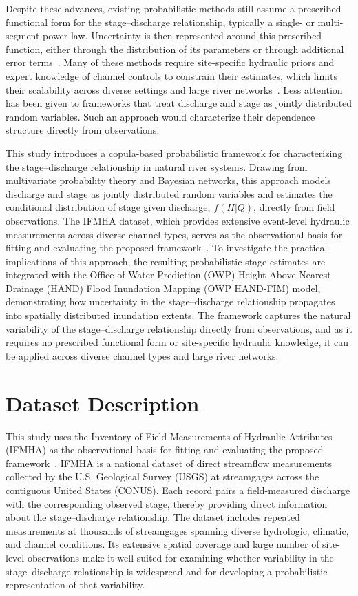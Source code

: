 \documentclass[11pt]{article}
\begin{document}
Despite these advances, existing probabilistic methods still assume a prescribed functional form for the stage--discharge relationship, typically a single- or multi-segment power law. Uncertainty is then represented around this prescribed function, either through the distribution of its parameters or through additional error terms~\cite{lecoz2014, reitan2008, mansanarez2016, mansanarez2019, mcmillan2015}. Many of these methods require site-specific hydraulic priors and expert knowledge of channel controls to constrain their estimates, which limits their scalability across diverse settings and large river networks~\cite{lecoz2014, mansanarez2019}. Less attention has been given to frameworks that treat discharge and stage as jointly distributed random variables. Such an approach would characterize their dependence structure directly from observations.

This study introduces a copula-based probabilistic framework for characterizing the stage--discharge relationship in natural river systems. Drawing from multivariate probability theory and Bayesian networks, this approach models discharge and stage as jointly distributed random variables and estimates the conditional distribution of stage given discharge, $f(H|Q)$, directly from field observations. The IFMHA dataset, which provides extensive event-level hydraulic measurements across diverse channel types, serves as the observational basis for fitting and evaluating the proposed framework~\cite{Erfani2024}. To investigate the practical implications of this approach, the resulting probabilistic stage estimates are integrated with the Office of Water Prediction (OWP) Height Above Nearest Drainage (HAND) Flood Inundation Mapping (OWP HAND-FIM) model, demonstrating how uncertainty in the stage--discharge relationship propagates into spatially distributed inundation extents. The framework captures the natural variability of the stage--discharge relationship directly from observations, and as it requires no prescribed functional form or site-specific hydraulic knowledge, it can be applied across diverse channel types and large river networks.

\section{Dataset Description} \label{sec:dataset}
This study uses the Inventory of Field Measurements of Hydraulic Attributes (IFMHA) as the observational basis for fitting and evaluating the proposed framework~\cite{Erfani2024}. IFMHA is a national dataset of direct streamflow measurements collected by the U.S. Geological Survey (USGS) at streamgages across the contiguous United States (CONUS). Each record pairs a field-measured discharge with the corresponding observed stage, thereby providing direct information about the stage--discharge relationship. The dataset includes repeated measurements at thousands of streamgages spanning diverse hydrologic, climatic, and channel conditions. Its extensive spatial coverage and large number of site-level observations make it well suited for examining whether variability in the stage--discharge relationship is widespread and for developing a probabilistic representation of that variability.
\end{document}
